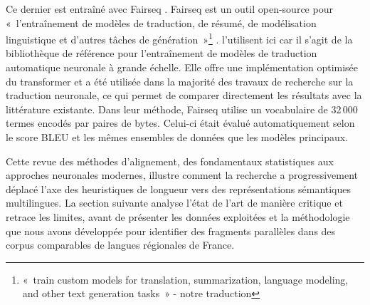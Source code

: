 Ce dernier est entraîné avec Fairseq \citep{ott_2019}. Fairseq est un outil open-source pour «~l'entraînement de modèles de traduction, de résumé,
de modélisation linguistique et d'autres tâches de génération~»\footnote{«~train custom models for
translation, summarization, language modeling, and other text generation tasks~» \citep{ott_2019}
- notre traduction} \citep{ott_2019}. \citet{steingrimsson_2023} l'utilisent ici car il s'agit de la bibliothèque de référence pour l'entraînement
de modèles de traduction automatique neuronale à grande échelle.
Elle offre une implémentation optimisée du transformer et a été utilisée dans la majorité des
travaux de recherche sur la traduction neuronale, ce qui permet de comparer directement les résultats avec la littérature existante.
Dans leur méthode, Fairseq utilise un vocabulaire de 32\,000 termes encodés par paires de bytes.
Celui-ci était évalué automatiquement selon le score BLEU et les mêmes ensembles de données que les modèles
principaux.

\vspace{5mm}

Cette revue des méthodes d'alignement, des fondamentaux statistiques aux approches neuronales modernes,
illustre comment la recherche a progressivement déplacé l'axe des heuristiques de longueur vers des
représentations sémantiques multilingues. La section suivante analyse l'état de l'art de manière critique
et retrace les limites, avant de présenter les données exploitées et la méthodologie que nous avons
développée pour identifier des fragments parallèles dans des corpus comparables de langues régionales de France.
